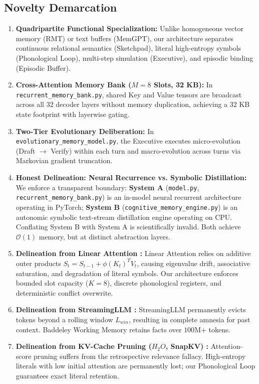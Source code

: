 \documentclass[11pt,a4paper]{article}
\begin{document}
\subsection{Novelty Demarcation}
\begin{enumerate}[leftmargin=*]
    \item \textbf{Quadripartite Functional Specialization:} Unlike homogeneous vector memory (RMT) or text buffers (MemGPT), our architecture separates continuous relational semantics (Sketchpad), literal high-entropy symbols (Phonological Loop), multi-step simulation (Executive), and episodic binding (Episodic Buffer).
    \item \textbf{Cross-Attention Memory Bank ($M=8$ Slots, 32 KB):} In \texttt{recurrent\_memory\_bank.py}, shared Key and Value tensors are broadcast across all 32 decoder layers without memory duplication, achieving a 32 KB state footprint with layerwise gating.
    \item \textbf{Two-Tier Evolutionary Deliberation:} In \texttt{evolutionary\_memory\_model.py}, the Executive executes micro-evolution (Draft $\to$ Verify) within each turn and macro-evolution across turns via Markovian gradient truncation.
    \item \textbf{Honest Delineation: Neural Recurrence vs. Symbolic Distillation:} We enforce a transparent boundary: \textbf{System A} (\texttt{model.py}, \texttt{recurrent\_memory\_bank.py}) is an in-model neural recurrent architecture operating in PyTorch; \textbf{System B} (\texttt{cognitive\_memory\_engine.py}) is an autonomic symbolic text-stream distillation engine operating on CPU. Conflating System B with System A is scientifically invalid. Both achieve $\mathcal{O}(1)$ memory, but at distinct abstraction layers.
    \item \textbf{Delineation from Linear Attention \cite{katharopoulos2020transformers}:} Linear Attention relies on additive outer products $S_t = S_{t-1} + \phi(K_t)^T V_t$, causing eigenvalue drift, associative saturation, and degradation of literal symbols. Our architecture enforces bounded slot capacity ($K=8$), discrete phonological registers, and deterministic conflict overwrite.
    \item \textbf{Delineation from StreamingLLM \cite{xiao2023efficient}:} StreamingLLM permanently evicts tokens beyond a rolling window $L_{win}$, resulting in complete amnesia for past context. Baddeley Working Memory retains facts over $100$M+ tokens.
    \item \textbf{Delineation from KV-Cache Pruning ($H_2O$, SnapKV) \cite{zhang2023h2o,li2024snapkv}:} Attention-score pruning suffers from the retrospective relevance fallacy. High-entropy literals with low initial attention are permanently lost; our Phonological Loop guarantees exact literal retention.

\end{enumerate}
\end{document}
